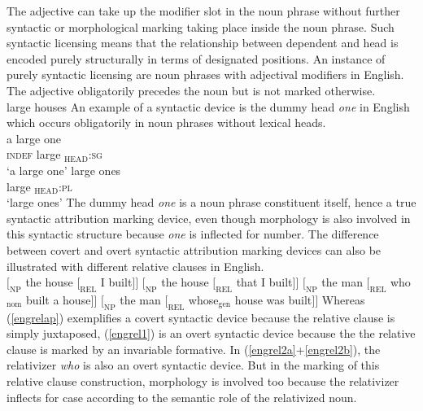 The adjective can take up the modifier slot in the noun phrase without further syntactic or morphological marking taking place inside the noun phrase. Such syntactic licensing means that the relationship between dependent and head is encoded purely structurally in terms of designated positions. An instance of purely syntactic licensing are noun phrases with adjectival modifiers in English. The adjective obligatorily precedes the noun but is not marked otherwise.
\ea 
{}\\
large houses
\z
An example of a syntactic device is the dummy head \textit{one} in English which occurs obligatorily in noun phrases without lexical heads.
\ea
{}\\
\ea
\gll 	a large one\\
   	\textsc{indef} large $_\textrm{HEAD}$\textsc{:sg}\\
\glt ‘a large one’
\ex
\gll	large ones\\
    	large $_\textrm{HEAD}$\textsc{:pl}\\
\glt ‘large ones’
\z
\z
The dummy head \textit{one} is a noun phrase constituent itself, hence a true syntactic attribution marking device, even though morphology is also involved in this syntactic structure because \textit{one} is inflected for number. The difference between covert and overt syntactic attribution marking devices can also be illustrated with different relative clauses in English.
\ea
{}\\
\ea $[_\textrm{NP}$ the house $[_\textrm{REL}$ I built$] ]$ \label{engrelap}
\ex $[_\textrm{NP}$ the house $[_\textrm{REL}$ that I built$] ]$ \label{engrel1}
\ea $[_\textrm{NP}$ the man $[_\textrm{REL}$ who$_\textrm{nom}$ built a house$] ]$ \label{engrel2a}
\ex $[_\textrm{NP}$ the man $[_\textrm{REL}$ whose$_\textrm{gen}$ house was built$] ]$ \label{engrel2b}
\z
\z
\z
Whereas (\ref{engrelap}) exemplifies a covert syntactic device because the relative clause is simply juxtaposed, (\ref{engrel1}) is an overt syntactic device because the the relative clause is marked by an invariable formative. In (\ref{engrel2a}+\ref{engrel2b}), the relativizer \textit{who} is also an overt syntactic device. But in the marking of this relative clause construction, morphology is involved too because the relativizer inflects for case according to the semantic role of the relativized noun.

